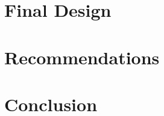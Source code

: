 \documentclass[12pt, a4paper]{article}
\begin{document}
\section{Final Design}



\newpage
\section{Recommendations}


\newpage

\section{Conclusion}



\newpage

\end{document}
